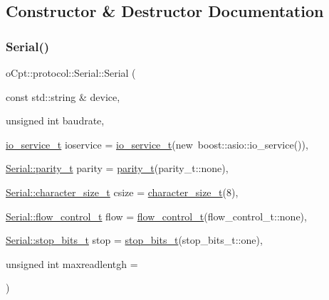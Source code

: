 \subsection{Constructor \& Destructor Documentation}
\hypertarget{classo_cpt_1_1protocol_1_1_serial_abb3db34ff95ecca7634e8b57095078a2}{}\label{classo_cpt_1_1protocol_1_1_serial_abb3db34ff95ecca7634e8b57095078a2} 
\subsubsection{\texorpdfstring{Serial()}{Serial()}}
{\footnotesize\ttfamily o\+Cpt\+::protocol\+::\+Serial\+::\+Serial (\begin{DoxyParamCaption}\item[{const std\+::string \&}]{device,  }\item[{unsigned int}]{baudrate,  }\item[{\hyperlink{classo_cpt_1_1protocol_1_1_serial_ac9305799ef4be4eb50f1274184492f04}{io\+\_\+service\+\_\+t}}]{ioservice = {\ttfamily \hyperlink{classo_cpt_1_1protocol_1_1_serial_ac9305799ef4be4eb50f1274184492f04}{io\+\_\+service\+\_\+t}(new~boost\+:\+:asio\+:\+:io\+\_\+service())},  }\item[{\hyperlink{classo_cpt_1_1protocol_1_1_serial_aae21a39fe2f321475ca19d46bf40d5f3}{Serial\+::parity\+\_\+t}}]{parity = {\ttfamily \hyperlink{classo_cpt_1_1protocol_1_1_serial_aae21a39fe2f321475ca19d46bf40d5f3}{parity\+\_\+t}(parity\+\_\+t\+:\+:none)},  }\item[{\hyperlink{classo_cpt_1_1protocol_1_1_serial_a8799e83d5d812132c296dd4a6a17d6f6}{Serial\+::character\+\_\+size\+\_\+t}}]{csize = {\ttfamily \hyperlink{classo_cpt_1_1protocol_1_1_serial_a8799e83d5d812132c296dd4a6a17d6f6}{character\+\_\+size\+\_\+t}(8)},  }\item[{\hyperlink{classo_cpt_1_1protocol_1_1_serial_ad32f1d64fb16a5443d7aae92e8b14232}{Serial\+::flow\+\_\+control\+\_\+t}}]{flow = {\ttfamily \hyperlink{classo_cpt_1_1protocol_1_1_serial_ad32f1d64fb16a5443d7aae92e8b14232}{flow\+\_\+control\+\_\+t}(flow\+\_\+control\+\_\+t\+:\+:none)},  }\item[{\hyperlink{classo_cpt_1_1protocol_1_1_serial_aadc4c803ade35920211e6c6a202a8c1f}{Serial\+::stop\+\_\+bits\+\_\+t}}]{stop = {\ttfamily \hyperlink{classo_cpt_1_1protocol_1_1_serial_aadc4c803ade35920211e6c6a202a8c1f}{stop\+\_\+bits\+\_\+t}(stop\+\_\+bits\+\_\+t\+:\+:one)},  }\item[{unsigned int}]{maxreadlentgh = {} }\end{DoxyParamCaption})}

